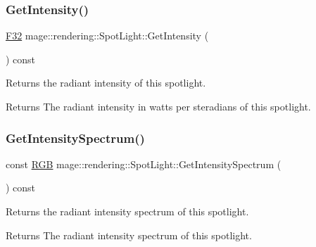 \subsubsection{\texorpdfstring{Get\+Intensity()}{GetIntensity()}}
{\footnotesize\ttfamily \hyperlink{namespacemage_aa97e833b45f06d60a0a9c4fc22ae02c0}{F32} mage\+::rendering\+::\+Spot\+Light\+::\+Get\+Intensity (\begin{DoxyParamCaption}{ }\end{DoxyParamCaption}) const\hspace{0.3cm}{\ttfamily [noexcept]}}

Returns the radiant intensity of this spotlight.

\begin{DoxyReturn}{Returns}
The radiant intensity in watts per steradians of this spotlight. 
\end{DoxyReturn}
\hypertarget{classmage_1_1rendering_1_1_spot_light_a049401f9c26b106acddfcb7ec09b0418}{}\label{classmage_1_1rendering_1_1_spot_light_a049401f9c26b106acddfcb7ec09b0418} 
\subsubsection{\texorpdfstring{Get\+Intensity\+Spectrum()}{GetIntensitySpectrum()}}
{\footnotesize\ttfamily const \hyperlink{structmage_1_1_r_g_b}{R\+GB} mage\+::rendering\+::\+Spot\+Light\+::\+Get\+Intensity\+Spectrum (\begin{DoxyParamCaption}{ }\end{DoxyParamCaption}) const\hspace{0.3cm}{\ttfamily [noexcept]}}

Returns the radiant intensity spectrum of this spotlight.

\begin{DoxyReturn}{Returns}
The radiant intensity spectrum of this spotlight. 
\end{DoxyReturn}
\hypertarget{classmage_1_1rendering_1_1_spot_light_ad617d1c098e2ca222a9736b8c45fa0c8}{}\label{classmage_1_1rendering_1_1_spot_light_ad617d1c098e2ca222a9736b8c45fa0c8} 
